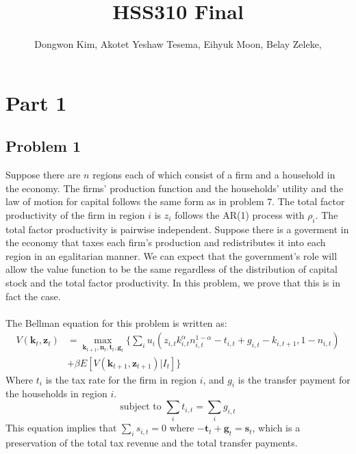 \documentclass{article}
\begin{document}
\author{Dongwon Kim, Akotet Yeshaw Tesema, Eihyuk Moon, Belay Zeleke, }
\title{HSS310 Final}

\maketitle


\section{Part 1}
\subsection{Problem 1}

\hspace{1em} Suppose there are \(n\) regions each of which consist of a firm and a household in the economy.
The firms' production function and the households' utility and the law of motion for capital follows the same form as in problem 7.
The total factor productivity of the firm in region \(i\) is \(z_i\) follows the AR(1) process with \(\rho_i\).
The total factor productivity is pairwise independent.
Suppose there is a goverment in the economy that taxes each firm's production and redistributes it into each region in an egalitarian manner.
We can expect that the government's role will allow the value function to be the same regardless of the distribution of capital stock and the total factor productivity.
In this problem, we prove that this is in fact the case.\\ \\
The Bellman equation for this problem is written as:
\begin{align*}
    V(\mathbf{k}_t, \mathbf{z}_t) &= \max_{\mathbf{k}_{t+1}, \mathbf{n}_{t}, \mathbf{t}_{t}, \mathbf{g}_{t}} \{ \sum_{i} u_{i}\left(z_{i,t} k_{i,t}^\alpha n_{i,t}^{1-\alpha} -t_{i, t} + g_{i, t} - k_{i, t+1}, 1 - n_{i,t}\right) \\
    &+ \beta E[V(\mathbf{k}_{t+1}, \mathbf{z}_{t+1}) | I_t] \}
\end{align*}
Where \(t_i\) is the tax rate for the firm in region \(i\), and \(g_i\) is the transfer payment for the households in region \(i\).
\begin{equation}
    \text{subject to } \sum_{i} t_{i, t} = \sum_{i} g_{i, t}
\end{equation}
This equation implies that \( \sum_{i} s_{i,t} = 0 \) where \( -\mathbf{t}_{t} + \mathbf{g}_{t} = \mathbf{s}_{t}\), which is a preservation of the total tax revenue and the total transfer payments.\\ \\
\end{document}
